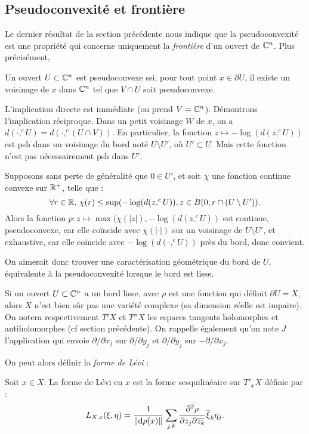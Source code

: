 \subsection{Pseudoconvexité et frontière}
Le dernier résultat de la section précédente nous indique que la pseudoconvexité est une propriété qui concerne uniquement la \emph{frontière} d'un ouvert de $\mathbb{C}^n$. Plus précisément,

\begin{prop}
	Un ouvert $U \subset \mathbb{C}^n$ est pseudoconvexe ssi, pour tout point $x\in \partial U$, il existe un voisinage de $x$ dans $\mathbb{C}^n$ tel que $V \cap U$ soit pseudoconvexe.
\end{prop}
\begin{preuve}
	L'implication directe est immédiate (on prend
        $V=\mathbb{C}^n$). Démontrons l'implication réciproque. Dans un petit
        voisinage $W$ de $x$, on a $d(\cdot,^cU)=d(\cdot,^c(U\cap
        V))$. En particulier, la fonction $z\mapsto -\log(d(z,^cU))$ est psh dans un voisinage du bord noté $U \setminus U'$, où $U' \subset U$. Mais cette fonction n'est pas nécessairement psh dans $U'$.
	
	Supposons sans perte de généralité que $0 \in U'$, et soit $\chi$ une fonction continue convexe sur $\mathbb{R}^+$, telle que :
	\begin{equation*}
		\forall r \in \mathbb{R},\,\chi(r)\leq \sup(-\log(d(z,^cU)), z\in B(0,r \cap (U \setminus U')).
	\end{equation*}
	Alors la fonction $p:z \mapsto \max(\chi(|z|),-\log(d(z,^cU))$ est continue, pseudoconvexe, car elle coïncide avec $\chi(|\cdot|)$ sur un voisinage de $U\setminus U'$, et exhaustive, car elle coïncide avec $-\log(d(\cdot, ^cU))$ près du bord, donc convient.
\end{preuve}

On aimerait donc trouver une caractérisation géométrique du bord de $U$, équivalente à la pseudoconvexité lorsque le bord est lisse.

Si un ouvert $U \subset \mathbb{C}^n$ a un bord lisse, avec $\rho$ est une fonction qui définit $\partial U=X$, alors $X$ n'est bien sûr pas une variété complexe (sa dimension réelle est impaire). On notera respectivement $T'X$ et $T''X$ les espaces tangents holomorphes et antiholomorphes (cf section précédente). On rappelle également qu'on note $J$ l'application qui envoie $\partial/\partial x_j$ sur $\partial/\partial y_j$ et $\partial/\partial y_j$ sur $-\partial/\partial x_j$.

On peut alors définir la \emph{forme de Lévi} :
\begin{defn}
	Soit $x\in X$. La forme de Lévi en $x$ est la forme sesquilinéaire sur $T'_xX$ définie par :
	\begin{equation*}
		L_{X.x}(\xi,\eta)=\cfrac{1}{\|\mathrm{d} \rho(x)\|}\,\sum_{j,k}\cfrac{\partial^2\rho}{\partial z_j\partial \overline{z_k}}\,\overline{\xi}_k\eta_j.
	\end{equation*}
\end{defn}


